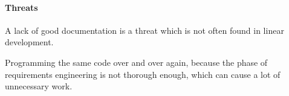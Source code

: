 \paragraph{Threats} 
\begin{itemize*}
        \item A lack of good documentation is a threat which is not often found in linear development.
        \item Programming the same code over and over again, because the phase of requirements engineering is not thorough enough, which can cause a lot of unnecessary work.
\end{itemize*}   
\setlist{}